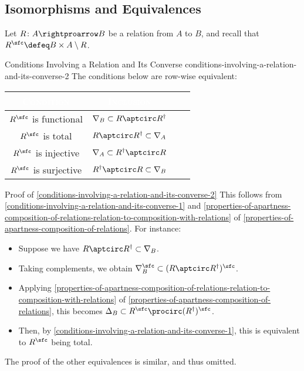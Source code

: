 \subsection{Isomorphisms and Equivalences}\label{subsection-isomorphisms-and-equivalences-in-rel-apartness}
Let $R\colon A\rightproarrow B$ be a relation from $A$ to $B$, and recall that $R^{\sfc}\defeq B\times A\setminus R$.
\begin{lemma}{Conditions Involving a Relation and Its Converse \rmII}{conditions-involving-a-relation-and-its-converse-2}%
    The conditions below are row-wise equivalent:
    \begingroup%
    \setlength\cellspacetoplimit{3pt}
    \setlength\cellspacebottomlimit{3pt}
    \renewcommand{\arraystretch}{1.2}
    \begin{center}
        \begin{tabular}{|Sc|Sc|}\hline{}
            \textcolor{white}{\textbf{\textsc{Condition}}} & \textcolor{white}{\textbf{\textsc{Inclusion}}}       \\\hline{}
            $R^{\sfc}$ is functional                       & $\nabla_{B}           \subset R\aptcirc R^{\dagger}$ \\
            $R^{\sfc}$ is total                            & $R\aptcirc R^{\dagger}\subset \nabla_{A}$            \\
            $R^{\sfc}$ is injective                        & $\nabla_{A}           \subset R^{\dagger}\aptcirc R$ \\
            $R^{\sfc}$ is surjective                       & $R^{\dagger}\aptcirc R\subset \nabla_{B}$            \\\hline
        \end{tabular}
    \end{center}
    \endgroup
\end{lemma}
\begin{Proof}{Proof of \cref{conditions-involving-a-relation-and-its-converse-2}}%
    This follows from \cref{conditions-involving-a-relation-and-its-converse-1} and \cref{properties-of-apartness-composition-of-relations-relation-to-composition-with-relations} of \cref{properties-of-apartness-composition-of-relations}. For instance:
    \begin{itemize}
        \item Suppose we have $R\aptcirc R^{\dagger}\subset\nabla_{B}$.
        \item Taking complements, we obtain $\nabla^{\sfc}_{B}\subset(R\aptcirc R^{\dagger})^{\sfc}$.
        \item Applying \cref{properties-of-apartness-composition-of-relations-relation-to-composition-with-relations} of \cref{properties-of-apartness-composition-of-relations}, this becomes $\Delta_{B}\subset R^{\sfc}\procirc(R^{\dagger})^{\sfc}$.
        \item Then, by \cref{conditions-involving-a-relation-and-its-converse-1}, this is equivalent to $R^{\sfc}$ being total.
    \end{itemize}
    The proof of the other equivalences is similar, and thus omitted.
\end{Proof}
